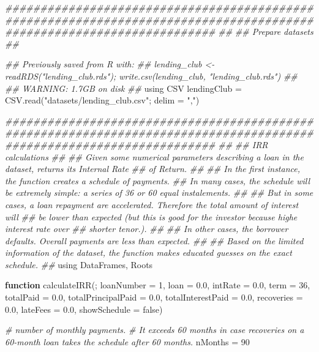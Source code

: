 \documentclass[11pt,]{report}
\newenvironment{Shaded}{\begin{snugshade}}{\end{snugshade}}
\newcommand{\CommentTok}[1]{\textcolor[rgb]{0.56,0.35,0.01}{\textit{#1}}}
\newcommand{\FloatTok}[1]{\textcolor[rgb]{0.00,0.00,0.81}{#1}}
\newcommand{\KeywordTok}[1]{\textcolor[rgb]{0.13,0.29,0.53}{\textbf{#1}}}
\newcommand{\NormalTok}[1]{#1}
\newcommand{\StringTok}[1]{\textcolor[rgb]{0.31,0.60,0.02}{#1}}
\begin{document}
\begin{Shaded}
\begin{Highlighting}[numbers=left,,]
\CommentTok{######################################################################################################################}
\CommentTok{##}
\CommentTok{## Prepare datasets}
\CommentTok{##}

\CommentTok{## Previously saved from R with:}
\CommentTok{##     lending_club <- readRDS("lending_club.rds"); write.csv(lending_club, "lending_club.rds")}
\CommentTok{##}
\CommentTok{## WARNING: 1.7GB on disk}
\CommentTok{##}
\NormalTok{using CSV}
\NormalTok{lendingClub = CSV.read(}\StringTok{"datasets/lending_club.csv"}\NormalTok{; delim = }\StringTok{","}\NormalTok{)}



\CommentTok{######################################################################################################################}
\CommentTok{##}
\CommentTok{## IRR calculations}
\CommentTok{##}
\CommentTok{## Given some numerical parameters describing a loan in the dataset, returns its Internal Rate}
\CommentTok{## of Return.}
\CommentTok{##}
\CommentTok{## In the first instance, the function creates a schedule of payments.}
\CommentTok{## In many cases, the schedule will be extremely simple: a series of 36 or 60 equal instalements.}
\CommentTok{##}
\CommentTok{## But in some cases, a loan repayment are accelerated. Therefore the total amount of interest will}
\CommentTok{## be lower than expected (but this is good for the investor because highe interest rate over}
\CommentTok{## shorter tenor.).}
\CommentTok{##}
\CommentTok{## In other cases, the borrower defaults. Overall payments are less than expected.}
\CommentTok{##}
\CommentTok{## Based on the limited information of the dataset, the function makes educated guesses on the exact schedule.}
\CommentTok{##}
\NormalTok{using DataFrames, Roots}

\KeywordTok{function}\NormalTok{ calculateIRR(; loanNumber = }\FloatTok{1}\NormalTok{, loan = }\FloatTok{0.0}\NormalTok{, intRate = }\FloatTok{0.0}\NormalTok{, term = }\FloatTok{36}\NormalTok{,}
\NormalTok{  totalPaid = }\FloatTok{0.0}\NormalTok{, totalPrincipalPaid = }\FloatTok{0.0}\NormalTok{, totalInterestPaid = }\FloatTok{0.0}\NormalTok{,}
\NormalTok{  recoveries = }\FloatTok{0.0}\NormalTok{, lateFees = }\FloatTok{0.0}\NormalTok{,}
\NormalTok{  showSchedule = false)}

  \CommentTok{# number of monthly payments.}
  \CommentTok{# It exceeds 60 months in case recoveries on a 60-month loan takes the schedule after 60 months.}
\NormalTok{  nMonths = }\FloatTok{90}


\end{Highlighting}
\end{Shaded}
\end{document}
